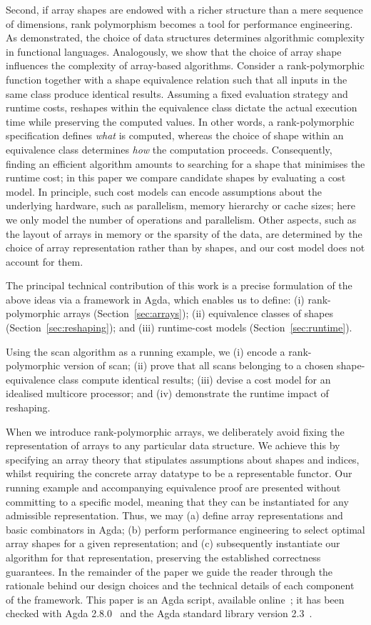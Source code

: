 Second, if array shapes are endowed with a richer structure than a mere
sequence of dimensions, rank polymorphism becomes a tool for performance
engineering. As \citet{10.5555/280586} demonstrated, the choice of data structures determines
algorithmic complexity in functional languages. Analogously, we show that the
choice of array shape influences the complexity of array-based algorithms.
Consider a rank-polymorphic function together with a shape equivalence relation
such that all inputs in the same class produce identical results. Assuming a
fixed evaluation strategy and runtime costs, reshapes within the equivalence
class dictate the actual execution time while preserving the computed values.
In other words, a rank-polymorphic specification defines \emph{what} is
computed, whereas the choice of shape within an equivalence class determines
\emph{how} the computation proceeds.  Consequently, finding an efficient
algorithm amounts to searching for a shape that minimises the runtime cost; in
this paper we compare candidate shapes by evaluating a cost model.  In
principle, such cost models can encode assumptions about the underlying
hardware, such as parallelism, memory hierarchy or cache sizes; here we only
model the number of operations and parallelism.  Other aspects, such as the
layout of arrays in memory or the sparsity of the data, are determined by the
choice of array representation rather than by shapes, and our cost model does
not account for them.

The principal technical contribution of this work is a precise formulation of
the above ideas via a framework in Agda, which enables us to define:
%
(i) rank-polymorphic arrays (Section~\ref{sec:arrays});
(ii) equivalence classes of shapes (Section~\ref{sec:reshaping}); and
(iii) runtime-cost models (Section~\ref{sec:runtime}).

Using the scan algorithm as a running example, we (i) encode a rank-polymorphic
version of scan; (ii) prove that all scans belonging to a chosen
shape-equivalence class compute identical results; (iii) devise a cost model
for an idealised multicore processor; and (iv) demonstrate the runtime impact
of reshaping.

When we introduce rank-polymorphic arrays, we deliberately avoid fixing the
representation of arrays to any particular data structure. We achieve this by
specifying an array theory that stipulates assumptions about shapes and
indices, whilst requiring the concrete array datatype to be a representable
functor. Our running example and accompanying equivalence proof are presented
without committing to a specific model, meaning that they can be instantiated
for any admissible representation. Thus, we may (a) define array
representations and basic combinators in Agda; (b) perform performance
engineering to select optimal array shapes for a given representation; and (c)
subsequently instantiate our algorithm for that representation, preserving the
established correctness guarantees.  In the remainder of the paper we guide
the reader through the rationale behind our design choices and the technical
details of each component of the framework.  This paper is an Agda
script, available online~\citep{paper-src}; it has been checked with
Agda 2.8.0~\citep{agda-2-8-0} and the Agda standard library
version 2.3~\citep{agda-stdlib-2-3}.
